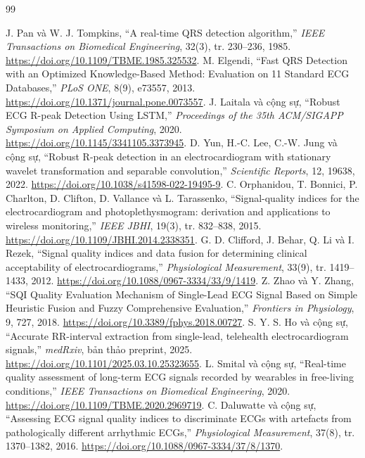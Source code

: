 \documentclass[12pt,a4paper,oneside]{report}
\begin{document}
\begin{thebibliography}{99}
\raggedright
{}
 J. Pan và W. J. Tompkins, ``A real-time QRS detection algorithm,'' \emph{IEEE Transactions on Biomedical Engineering}, 32(3), tr. 230--236, 1985. \url{https://doi.org/10.1109/TBME.1985.325532}.
 M. Elgendi, ``Fast QRS Detection with an Optimized Knowledge-Based Method: Evaluation on 11 Standard ECG Databases,'' \emph{PLoS ONE}, 8(9), e73557, 2013. \url{https://doi.org/10.1371/journal.pone.0073557}.
 J. Laitala và cộng sự, ``Robust ECG R-peak Detection Using LSTM,'' \emph{Proceedings of the 35th ACM/SIGAPP Symposium on Applied Computing}, 2020. \url{https://doi.org/10.1145/3341105.3373945}.
 D. Yun, H.-C. Lee, C.-W. Jung và cộng sự, ``Robust R-peak detection in an electrocardiogram with stationary wavelet transformation and separable convolution,'' \emph{Scientific Reports}, 12, 19638, 2022. \url{https://doi.org/10.1038/s41598-022-19495-9}.
 C. Orphanidou, T. Bonnici, P. Charlton, D. Clifton, D. Vallance và L. Tarassenko, ``Signal-quality indices for the electrocardiogram and photoplethysmogram: derivation and applications to wireless monitoring,'' \emph{IEEE JBHI}, 19(3), tr. 832--838, 2015. \url{https://doi.org/10.1109/JBHI.2014.2338351}.
 G. D. Clifford, J. Behar, Q. Li và I. Rezek, ``Signal quality indices and data fusion for determining clinical acceptability of electrocardiograms,'' \emph{Physiological Measurement}, 33(9), tr. 1419--1433, 2012. \url{https://doi.org/10.1088/0967-3334/33/9/1419}.
 Z. Zhao và Y. Zhang, ``SQI Quality Evaluation Mechanism of Single-Lead ECG Signal Based on Simple Heuristic Fusion and Fuzzy Comprehensive Evaluation,'' \emph{Frontiers in Physiology}, 9, 727, 2018. \url{https://doi.org/10.3389/fphys.2018.00727}.
 S. Y. S. Ho và cộng sự, ``Accurate RR-interval extraction from single-lead, telehealth electrocardiogram signals,'' \emph{medRxiv}, bản thảo preprint, 2025. \url{https://doi.org/10.1101/2025.03.10.25323655}.
 L. Smital và cộng sự, ``Real-time quality assessment of long-term ECG signals recorded by wearables in free-living conditions,'' \emph{IEEE Transactions on Biomedical Engineering}, 2020. \url{https://doi.org/10.1109/TBME.2020.2969719}.
 C. Daluwatte và cộng sự, ``Assessing ECG signal quality indices to discriminate ECGs with artefacts from pathologically different arrhythmic ECGs,'' \emph{Physiological Measurement}, 37(8), tr. 1370--1382, 2016. \url{https://doi.org/10.1088/0967-3334/37/8/1370}.

\end{thebibliography}
\end{document}
